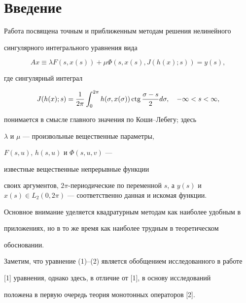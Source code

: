 \label{begin}





\section*{Введение}





Работа посвящена точным и приближенным методам решения нелинейного


сингулярного интегрального уравнения вида


\begin{equation}


Ax\equiv \lambda F(s,x(s))+\mu \Phi(s,x(s), J(h(x);s)) =y(s),


\end{equation}


где сингулярный интеграл


\begin{equation}


J(h(x);s)=\frac{1}{2\pi}\int_0^{2\pi}h(\sigma,x(\sigma))


\ctg\frac{\sigma -s}{2}d\sigma,\quad -\infty <s<\infty,


\end{equation}


понимается в смысле главного значения по Коши--Лебегу; здесь


$\lambda$ и $\mu$ --- произвольные вещественные параметры,


$F(s,u)$, $h(s,u)$ и $\Phi(s,u,v)$ ---


известные вещественные непрерывные функции


своих аргументов, $2\pi$-периодические по переменной $s$, а $y(s)$ и $x(s)\in


L_2(0,2\pi)$ --- соответственно данная и искомая функции.


Основное внимание уделяется квадратурным методам как наиболее удобным в


приложениях, но в то же время как наиболее трудным в теоретическом


обосновании.





Заметим, что уравнение (1)--(2) является обобщением исследованного в работе


[1] уравнения, однако здесь, в отличие от [1], в основу исследований


положена в первую очередь теория монотонных операторов [2].


